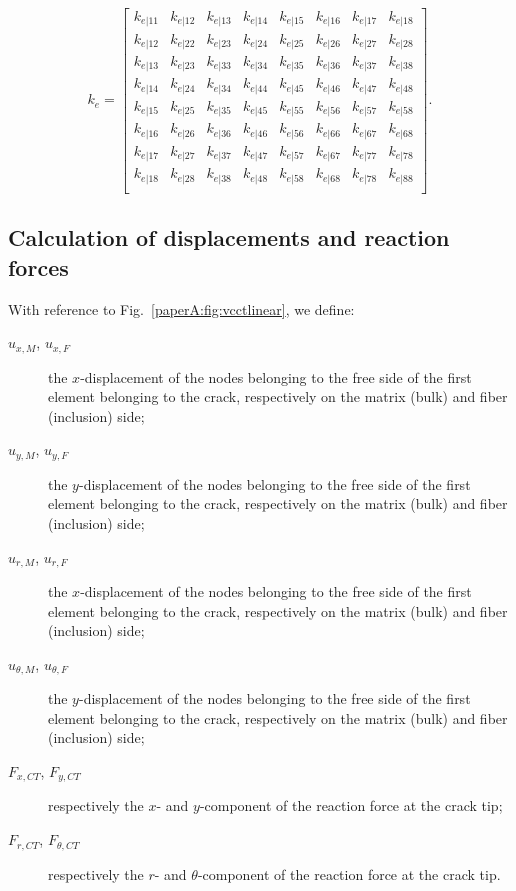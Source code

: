 \begin{equation}\label{paperA:eq:elstiffmatrix}
k_{e}=\begin{bmatrix}
k_{e|11}&k_{e|12}&k_{e|13}&k_{e|14}&k_{e|15}&k_{e|16}&k_{e|17}&k_{e|18}\\
k_{e|12}&k_{e|22}&k_{e|23}&k_{e|24}&k_{e|25}&k_{e|26}&k_{e|27}&k_{e|28}\\
k_{e|13}&k_{e|23}&k_{e|33}&k_{e|34}&k_{e|35}&k_{e|36}&k_{e|37}&k_{e|38}\\
k_{e|14}&k_{e|24}&k_{e|34}&k_{e|44}&k_{e|45}&k_{e|46}&k_{e|47}&k_{e|48}\\
k_{e|15}&k_{e|25}&k_{e|35}&k_{e|45}&k_{e|55}&k_{e|56}&k_{e|57}&k_{e|58}\\
k_{e|16}&k_{e|26}&k_{e|36}&k_{e|46}&k_{e|56}&k_{e|66}&k_{e|67}&k_{e|68}\\
k_{e|17}&k_{e|27}&k_{e|37}&k_{e|47}&k_{e|57}&k_{e|67}&k_{e|77}&k_{e|78}\\
k_{e|18}&k_{e|28}&k_{e|38}&k_{e|48}&k_{e|58}&k_{e|68}&k_{e|78}&k_{e|88}\\
\end{bmatrix}.
\end{equation}

\subsection{Calculation of displacements and reaction forces}

With reference to Fig.~\ref{paperA:fig:vcctlinear}, we define:

\begin{description}
\item[$u_{x,M}$, $u_{x,F}$] the $x$-displacement of the nodes belonging to the free side of the first element belonging to the crack, respectively on the matrix (bulk) and fiber (inclusion) side;
\item[$u_{y,M}$, $u_{y,F}$] the $y$-displacement of the nodes belonging to the free side of the first element belonging to the crack, respectively on the matrix (bulk) and fiber (inclusion) side;
\item[$u_{r,M}$, $u_{r,F}$] the $x$-displacement of the nodes belonging to the free side of the first element belonging to the crack, respectively on the matrix (bulk) and fiber (inclusion) side;
\item[$u_{\theta,M}$, $u_{\theta,F}$] the $y$-displacement of the nodes belonging to the free side of the first element belonging to the crack, respectively on the matrix (bulk) and fiber (inclusion) side;
\item[$F_{x,CT}$, $F_{y,CT}$] respectively the $x$- and $y$-component of the reaction force at the crack tip;
\item[$F_{r,CT}$, $F_{\theta,CT}$] respectively the $r$- and $\theta$-component of the reaction force at the crack tip.
\end{description}

